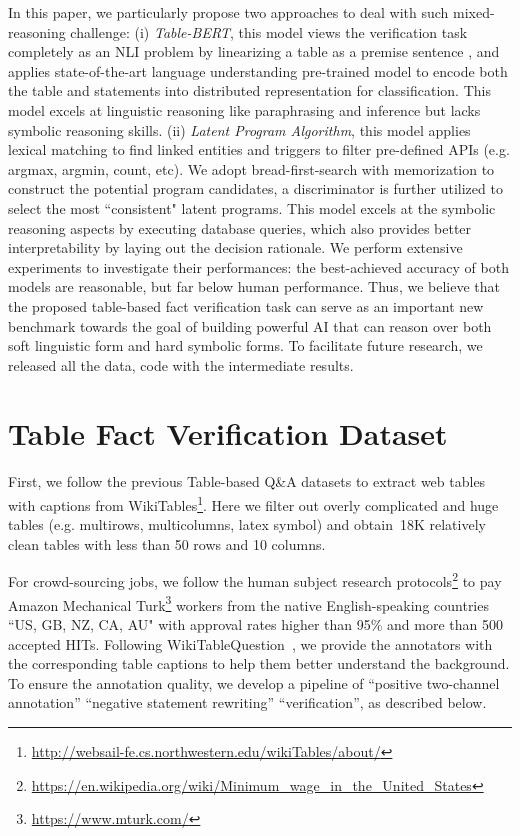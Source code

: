 \documentclass{article} \usepackage{iclr2020_conference,times}
\begin{document}
In this paper, we particularly propose two approaches to deal with such mixed-reasoning challenge: (i) \emph{Table-BERT}, this model views the verification task completely as an NLI problem by linearizing a table as a premise sentence , and applies state-of-the-art language understanding pre-trained model to encode both the table and statements  into distributed representation for classification. This model excels at linguistic reasoning like paraphrasing and inference but lacks symbolic reasoning skills. (ii) \emph{Latent Program Algorithm}, this model applies lexical matching to find linked entities and triggers to filter pre-defined APIs (e.g. argmax, argmin, count, etc). We adopt bread-first-search with memorization to construct the potential program candidates, a discriminator is further utilized to select the most ``consistent" latent programs. This model excels at the symbolic reasoning aspects by executing database queries, which also provides better interpretability by laying out the decision rationale. We perform extensive experiments to investigate their performances: the best-achieved accuracy of both models are reasonable, but far below human performance. Thus, we believe that the proposed table-based fact verification task can serve as an important new benchmark towards the goal of building powerful AI that can reason over both soft linguistic form and hard symbolic forms. To facilitate future research, we released all the data, code with the intermediate results. 


\section{Table Fact Verification Dataset}
First, we follow the previous Table-based Q\&A datasets \citep{pasupat2015compositional,zhong2017seq2sql} to extract web tables~\citep{bhagavatula2013methods} with captions from WikiTables\footnote{\url{http://websail-fe.cs.northwestern.edu/wikiTables/about/}}. Here we filter out overly complicated and huge tables (e.g. multirows, multicolumns, latex symbol) and obtain~18K relatively clean tables with less than 50 rows and 10 columns. 

For crowd-sourcing jobs, we follow the human subject research protocols\footnote{\url{https://en.wikipedia.org/wiki/Minimum_wage_in_the_United_States}} to pay Amazon Mechanical Turk\footnote{\url{https://www.mturk.com/}} workers from the native English-speaking countries ``US, GB, NZ, CA, AU" with approval rates higher than 95\% and more than 500 accepted HITs. Following WikiTableQuestion~\citep{pasupat2015compositional}, we provide the annotators with the corresponding table captions to help them better understand the background. To ensure the annotation quality, we develop a pipeline of ``positive two-channel annotation''  ``negative statement rewriting''  ``verification'', as described below. 
\end{document}
